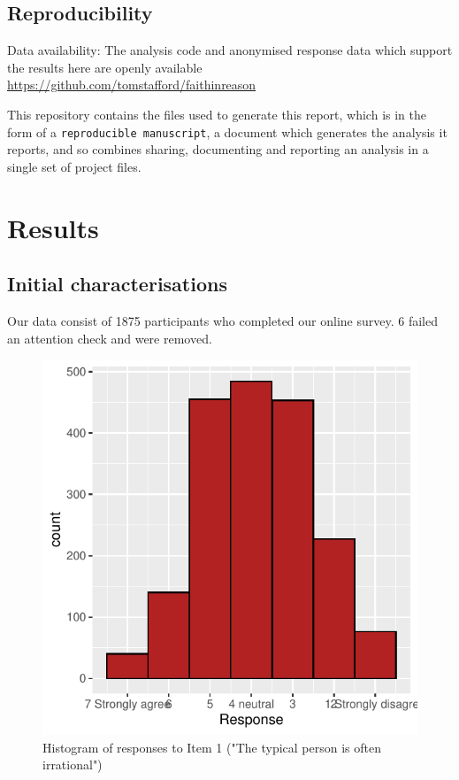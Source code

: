 \documentclass[
  ,jou,floatsintext]{apa6}
\begin{document}
\hypertarget{reproducibility}{%
\subsection{Reproducibility}\label{reproducibility}}

Data availability: The analysis code and anonymised response data which support the results here are openly available \url{https://github.com/tomstafford/faithinreason}

This repository contains the files used to generate this report, which is in the form of a \texttt{reproducible\ manuscript}, a document which generates the analysis it reports, and so combines sharing, documenting and reporting an analysis in a single set of project files.

\hypertarget{results}{%
\section{Results}\label{results}}

\hypertarget{initial-characterisations}{%
\subsection{Initial characterisations}\label{initial-characterisations}}

Our data consist of 1875 participants who completed our online survey. 6 failed an attention check and were removed.

\begin{figure}

{\centering \includegraphics[width=0.75\linewidth]{faithinreason_files/figure-latex/ourhistogram-1} 

}

\caption{Histogram of responses to Item 1 ("The typical person is often irrational")}\label{fig:ourhistogram}
\end{figure}
\end{document}
